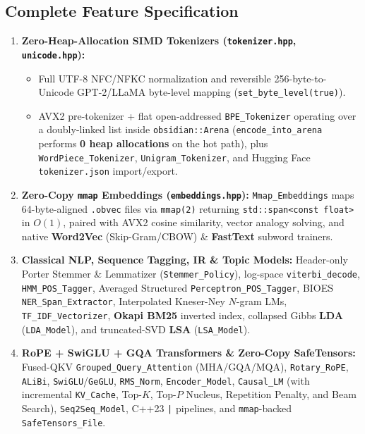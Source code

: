\documentclass[11pt,a4paper]{article}
\begin{document}
\subsection{Complete Feature Specification}
\begin{enumerate}[leftmargin=1.5em]
  \item \textbf{Zero-Heap-Allocation SIMD Tokenizers (\texttt{tokenizer.hpp}, \texttt{unicode.hpp}):}
  \begin{itemize}
    \item Full UTF-8 NFC/NFKC normalization and reversible 256-byte-to-Unicode GPT-2/LLaMA byte-level mapping (\texttt{set\_byte\_level(true)}).
    \item AVX2 pre-tokenizer + flat open-addressed \texttt{BPE\_Tokenizer} operating over a doubly-linked list inside \texttt{obsidian::Arena} (\texttt{encode\_into\_arena} performs \textbf{0 heap allocations} on the hot path), plus \texttt{WordPiece\_Tokenizer}, \texttt{Unigram\_Tokenizer}, and Hugging Face \texttt{tokenizer.json} import/export.
  \end{itemize}
  \item \textbf{Zero-Copy \texttt{mmap} Embeddings (\texttt{embeddings.hpp}):} \texttt{Mmap\_Embeddings} maps 64-byte-aligned \texttt{.obvec} files via \texttt{mmap(2)} returning \texttt{std::span<const float>} in $O(1)$, paired with AVX2 cosine similarity, vector analogy solving, and native \textbf{Word2Vec} (Skip-Gram/CBOW) \& \textbf{FastText} subword trainers.
  \item \textbf{Classical NLP, Sequence Tagging, IR \& Topic Models:} Header-only Porter Stemmer \& Lemmatizer (\texttt{Stemmer\_Policy}), log-space \texttt{viterbi\_decode}, \texttt{HMM\_POS\_Tagger}, Averaged Structured \texttt{Perceptron\_POS\_Tagger}, BIOES \texttt{NER\_Span\_Extractor}, Interpolated Kneser-Ney $N$-gram LMs, \texttt{TF\_IDF\_Vectorizer}, \textbf{Okapi BM25} inverted index, collapsed Gibbs \textbf{LDA} (\texttt{LDA\_Model}), and truncated-SVD \textbf{LSA} (\texttt{LSA\_Model}).
  \item \textbf{RoPE + SwiGLU + GQA Transformers \& Zero-Copy SafeTensors:} Fused-QKV \texttt{Grouped\_Query\_Attention} (MHA/GQA/MQA), \texttt{Rotary\_RoPE}, \texttt{ALiBi}, \texttt{SwiGLU}/\texttt{GeGLU}, \texttt{RMS\_Norm}, \texttt{Encoder\_Model}, \texttt{Causal\_LM} (with incremental \texttt{KV\_Cache}, Top-$K$, Top-$P$ Nucleus, Repetition Penalty, and Beam Search), \texttt{Seq2Seq\_Model}, C++23 \texttt{|} pipelines, and \texttt{mmap}-backed \texttt{SafeTensors\_File}.
\end{enumerate}
\end{document}
